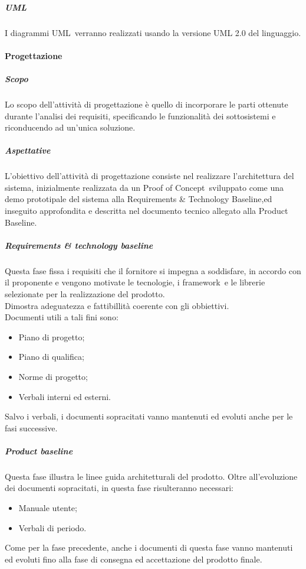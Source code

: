             \subparagraph{UML} \label{subparagraph:UML}
            I diagrammi UML\glo\ verranno realizzati usando la versione UML 2.0 del linguaggio.
          
        \paragraph{Progettazione} \label{paragraph:Progettazione}

            \subparagraph{Scopo} \label{subparagraph:Progettazione_Scopo}
            Lo scopo dell'attività di progettazione è quello di incorporare le parti ottenute durante l'analisi dei requisiti, specificando le funzionalità dei sottosistemi
            e riconducendo ad un’unica soluzione. 

            \subparagraph{Aspettative} \label{subparagraph:Progettazione_Aspettative}
            L’obiettivo dell’attività di progettazione consiste nel realizzare l’architettura del sistema, inizialmente realizzata da un Proof of Concept\glo\ sviluppato come
            una demo prototipale del sistema alla Requirements \& Technology Baseline,ed inseguito approfondita e descritta nel documento tecnico allegato alla Product Baseline.

            \subparagraph{Requirements \& technology baseline} \label{subparagraph:Requirements & technology baseline}
            Questa fase fissa i requisiti che il fornitore si impegna a soddisfare, in accordo con il proponente e vengono motivate le tecnologie,
            i framework\glo\ e le librerie selezionate per la realizzazione del prodotto.\\
            Dimostra adeguatezza e fattibillità coerente con gli obbiettivi.\\
            Documenti utili a tali fini sono:
            \begin{itemize}
                \item Piano di progetto;
                \item Piano di qualifica;
                \item Norme di progetto;
                \item Verbali interni ed esterni.
            \end{itemize}
            Salvo i verbali, i documenti sopracitati vanno mantenuti ed evoluti anche per le fasi successive.\\


            \subparagraph{Product baseline} \label{subparagraph:Product baseline}
            Questa fase illustra le linee guida architetturali del prodotto.
            Oltre all'evoluzione dei documenti sopracitati, in questa fase risulteranno necessari:
            \begin{itemize}
                \item Manuale utente;
                \item Verbali di periodo.
            \end{itemize}
            Come per la fase precedente, anche i documenti di questa fase vanno mantenuti ed evoluti fino alla fase di consegna ed accettazione del prodotto finale.

